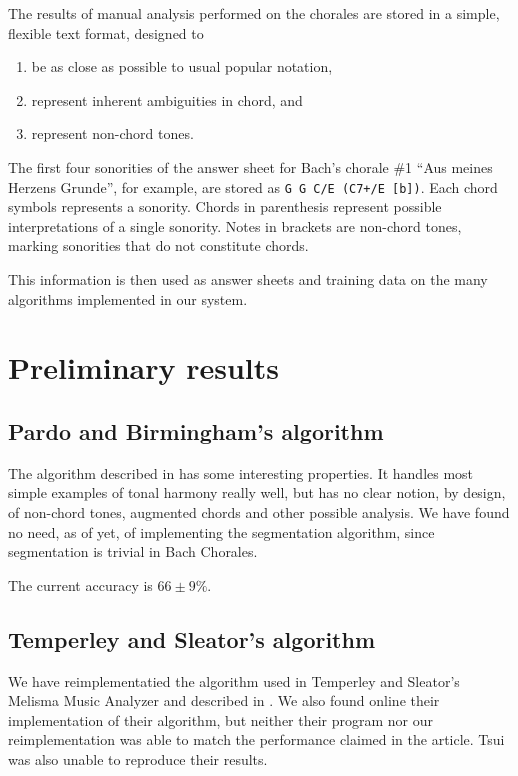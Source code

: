 \documentclass{article}
\begin{document}
The results of manual analysis performed on the chorales are stored in
a simple, flexible text format, designed to

\begin{enumerate}
\item be as close as possible to usual popular notation,
\item represent inherent ambiguities in chord, and
\item represent non-chord tones.
\end{enumerate}

The first four sonorities of the answer sheet for Bach's chorale \#1
``Aus meines Herzens Grunde'', for example, are stored as \texttt{G G
  C/E (C7+/E [b])}. Each chord symbols represents a sonority. Chords
in parenthesis represent possible interpretations of a single
sonority. Notes in brackets are non-chord tones, marking sonorities
that do not constitute chords.

This information is then used as answer sheets and training data on the
many algorithms implemented in our system.

\section{Preliminary results}
\label{sec:analysis-results}

\subsection{Pardo and Birmingham's algorithm}
\label{sec:pardo-birmingham}

The algorithm described in \cite{pardo.ea:automated} has some
interesting properties. It handles most simple examples of tonal
harmony really well, but has no clear notion, by design, of non-chord
tones, augmented chords and other possible analysis. We
have found no need, as of yet, of implementing the segmentation
algorithm, since segmentation is trivial in Bach Chorales.

The current accuracy is $66 \pm 9\%$.

\subsection{Temperley and Sleator's algorithm}
\label{sec:temperley}

We have reimplementatied the algorithm used in Temperley and Sleator's
Melisma Music Analyzer and described in
\cite{temperley.ea:modeling}. We also found online their
implementation of their algorithm, but neither their program nor our
reimplementation was able to match the performance claimed in the
article. Tsui \cite{tsui:harmonic} was also unable to reproduce their
results.
\end{document}
